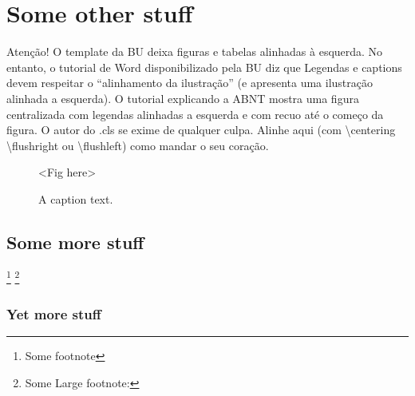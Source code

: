 \documentclass[english]{ufsc-thesis-rn46-2019}
\begin{document}
\section{Some other stuff}

Atenção! O template da BU deixa figuras e tabelas alinhadas à esquerda. No entanto, o tutorial de Word disponibilizado pela BU diz que Legendas e captions devem respeitar o ``alinhamento da ilustração'' (e apresenta uma ilustração alinhada a esquerda). O tutorial explicando a ABNT mostra uma figura centralizada com legendas alinhadas a esquerda e com recuo até o começo da figura. O autor do .cls se exime de qualquer culpa. Alinhe aqui (com \textbackslash{}centering \textbackslash{}flushright ou \textbackslash{}flushleft) como mandar o seu coração.

\begin{figure}[tb]
  \centering
  \caption{\footnotesize A caption text.}
  \label{fig:f}

  <Fig here>
\end{figure}


\subsection{Some more stuff}
\label{sec:more}

\lipsum[1] \footnote{Some footnote}
\footnote{Some Large footnote: \lipsum[4]}

\subsubsection{Yet more stuff}
\label{sec:yet-more}

\lipsum[1]

\label{sec:yet-another}

\lipsum[1]

\postextual

\end{document}
